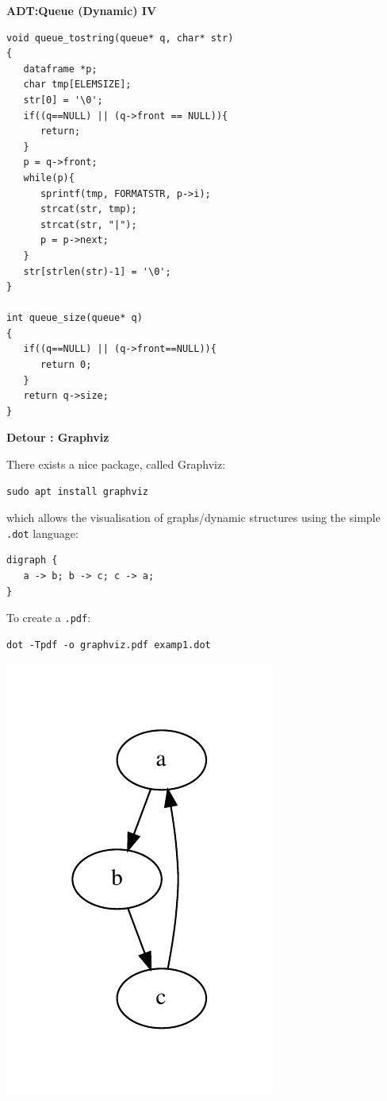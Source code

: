 \documentclass[a4,portraitt]{slides}
\begin{document}
\newpage
{\samepage
\begin{center}
{\Large{\bf ADT:Queue (Dynamic) IV}}
\end{center}
{\small
\begin{verbatim}
void queue_tostring(queue* q, char* str)
{
   dataframe *p;
   char tmp[ELEMSIZE];
   str[0] = '\0';
   if((q==NULL) || (q->front == NULL)){
      return;
   }
   p = q->front;
   while(p){
      sprintf(tmp, FORMATSTR, p->i);
      strcat(str, tmp);
      strcat(str, "|");
      p = p->next;
   }
   str[strlen(str)-1] = '\0';
}

int queue_size(queue* q)
{
   if((q==NULL) || (q->front==NULL)){
      return 0;
   }
   return q->size;
}
\end{verbatim}
} }

\newpage
{\samepage
\begin{center}
{\Large{\bf Detour : Graphviz}}
\end{center}
There exists a nice package, called Graphviz:
\begin{verbatim}
sudo apt install graphviz
\end{verbatim}
which allows the visualisation of graphs/dynamic structures
using the simple \verb^.dot^ language:
\begin{verbatim}
digraph {
   a -> b; b -> c; c -> a;
}
\end{verbatim}

To create a \verb^.pdf^:
\begin{verbatim}
dot -Tpdf -o graphviz.pdf examp1.dot
\end{verbatim}
\begin{center}
\includegraphics[scale=0.75]{../Images/graphviz.pdf}
\end{center}
}
\end{document}
